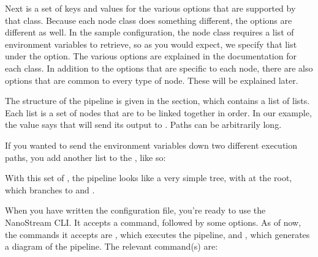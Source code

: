 \documentclass[letterpaper,10pt,english]{sphinxmanual}
\begin{document}
Next is a set of keys and values for the various options that are supported by that class. Because each node class does something different,
the options are different as well. In the sample configuration, the
 node class requires a list of environment variables to retrieve, so as you would expect, we specify that list under the  option. The various options are explained in
the documentation for each class. In addition to the options that are specific to each node, there are also options that are common to every type of node. These will be explained later.

The structure of the pipeline is given in the  section, which contains a list of lists. Each list is a set of nodes that are to be linked together in
order. In our example, the  value says that
 will send its output to .
Paths can be arbitrarily long.

If you wanted to send the environment variables down two different execution
paths, you add another list to the , like so:

%
\begin{sphinxVerbatim}[commandchars=\\\{\}]
     
     
     
     
     
\end{sphinxVerbatim}

With this set of , the pipeline looks like a very simple tree, with
 at the root, which branches to
 and .

When you have written the configuration file, you’re ready to use the
NanoStream CLI. It accepts a command, followed by some options. As of now, the
commands it accepts are , which executes the pipeline, and ,
which generates a diagram of the pipeline. The relevant command(s) are:
\end{document}
